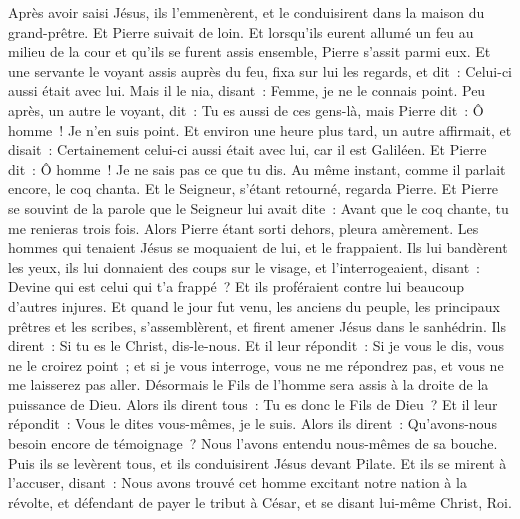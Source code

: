 \begin{multicols}{2}
Après avoir saisi Jésus, ils l'emmenèrent, et le conduisirent dans la maison du grand-prêtre. Et Pierre suivait de loin.
Et lorsqu'ils eurent allumé un feu au milieu de la cour et qu'ils se furent assis ensemble, Pierre s'assit parmi eux.
Et une servante le voyant assis auprès du feu, fixa sur lui les regards, et dit~: Celui-ci aussi était avec lui.
Mais il le nia, disant~: Femme, je ne le connais point.
Peu après, un autre le voyant, dit~: Tu es aussi de ces gens-là, mais Pierre dit~: Ô homme~! Je n'en suis point.
Et environ une heure plus tard, un autre affirmait, et disait~: Certainement celui-ci aussi était avec lui, car il est Galiléen.
Et Pierre dit~: Ô homme~! Je ne sais pas ce que tu dis. Au même instant, comme il parlait encore, le coq chanta.
Et le Seigneur, s'étant retourné, regarda Pierre. Et Pierre se souvint de la parole que le Seigneur lui avait dite~: Avant que le coq chante, tu me renieras trois fois.
Alors Pierre étant sorti dehors, pleura amèrement.
Les hommes qui tenaient Jésus se moquaient de lui, et le frappaient.
Ils lui bandèrent les yeux, ils lui donnaient des coups sur le visage, et l'interrogeaient, disant~: Devine qui est celui qui t'a frappé~?
Et ils proféraient contre lui beaucoup d'autres injures.
Et quand le jour fut venu, les anciens du peuple, les principaux prêtres et les scribes, s'assemblèrent, et firent amener Jésus dans le sanhédrin.
Ils dirent~: Si tu es le Christ, dis-le-nous. Et il leur répondit~: Si je vous le dis, vous ne le croirez point~;
et si je vous interroge, vous ne me répondrez pas, et vous ne me laisserez pas aller.
Désormais le Fils de l'homme sera assis à la droite de la puissance de Dieu.
Alors ils dirent tous~: Tu es donc le Fils de Dieu~? Et il leur répondit~: Vous le dites vous-mêmes, je le suis.
Alors ils dirent~: Qu'avons-nous besoin encore de témoignage~? Nous l'avons entendu nous-mêmes de sa bouche.
\VerseOne{}Puis ils se levèrent tous, et ils conduisirent Jésus devant Pilate.
Et ils se mirent à l'accuser, disant~: Nous avons trouvé cet homme excitant notre nation à la révolte, et défendant de payer le tribut à César, et se disant lui-même Christ, Roi.

\end{multicols}
